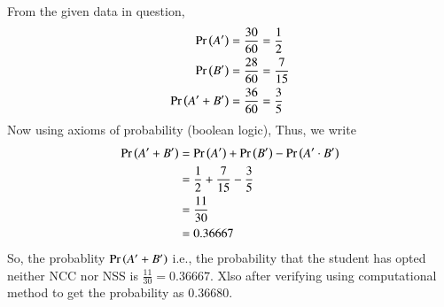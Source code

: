 \documentclass[journal]{IEEEtran}
\begin{document}
From the given data in question,
    \begin{align}
        \Pr\left(A^\prime\right) &= \frac{30}{60} = \frac{1}{2} \\
        \Pr\left(B^\prime\right) &= \frac{28}{60} = \frac{7}{15} \\
        \Pr\left(A^\prime + B^\prime\right) &= \frac{36}{60} = \frac{3}{5}    
    \end{align}
Now using axioms of probability (boolean logic),
Thus, we write
    \begin{align}
	    \Pr\left(A^\prime + B^\prime\right) &= \Pr\left(A^\prime\right) +  \Pr\left(B^\prime\right) - \Pr\left(A^\prime \cdot B^\prime\right) \\
	                                 &= \frac{1}{2} + \frac{7}{15} - \frac{3}{5} \\
	                                 &= \frac{11}{30} \\
	                                 &= 0.36667
    \end{align} 
So, the probablity $\Pr\left(A^\prime + B^\prime\right)$ i.e., the probability that the student has opted neither NCC nor NSS is $\frac{11}{30} = 0.36667$.
Xlso after verifying using computational method to get the probability as 0.36680.
\end{document}
